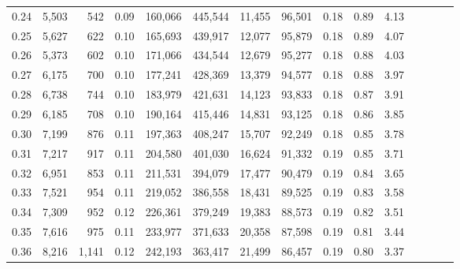 \begin{tabular}{rrrcrrrrrrrrrrr}
0.24 &   5,503 &     542 &                                       0.09 &  160,066 &  445,544 &   11,455 &   96,501 &  0.18 &  0.89 &                         4.13 \\
0.25 &   5,627 &     622 &                                       0.10 &  165,693 &  439,917 &   12,077 &   95,879 &  0.18 &  0.89 &                         4.07 \\
0.26 &   5,373 &     602 &                                       0.10 &  171,066 &  434,544 &   12,679 &   95,277 &  0.18 &  0.88 &                         4.03 \\
0.27 &   6,175 &     700 &                                       0.10 &  177,241 &  428,369 &   13,379 &   94,577 &  0.18 &  0.88 &                         3.97 \\
0.28 &   6,738 &     744 &                                       0.10 &  183,979 &  421,631 &   14,123 &   93,833 &  0.18 &  0.87 &                         3.91 \\
0.29 &   6,185 &     708 &                                       0.10 &  190,164 &  415,446 &   14,831 &   93,125 &  0.18 &  0.86 &                         3.85 \\
0.30 &   7,199 &     876 &                                       0.11 &  197,363 &  408,247 &   15,707 &   92,249 &  0.18 &  0.85 &                         3.78 \\
0.31 &   7,217 &     917 &                                       0.11 &  204,580 &  401,030 &   16,624 &   91,332 &  0.19 &  0.85 &                         3.71 \\
0.32 &   6,951 &     853 &                                       0.11 &  211,531 &  394,079 &   17,477 &   90,479 &  0.19 &  0.84 &                         3.65 \\
0.33 &   7,521 &     954 &                                       0.11 &  219,052 &  386,558 &   18,431 &   89,525 &  0.19 &  0.83 &                         3.58 \\
0.34 &   7,309 &     952 &                                       0.12 &  226,361 &  379,249 &   19,383 &   88,573 &  0.19 &  0.82 &                         3.51 \\
0.35 &   7,616 &     975 &                                       0.11 &  233,977 &  371,633 &   20,358 &   87,598 &  0.19 &  0.81 &                         3.44 \\
0.36 &   8,216 &   1,141 &                                       0.12 &  242,193 &  363,417 &   21,499 &   86,457 &  0.19 &  0.80 &                         3.37 \\

\end{tabular}
